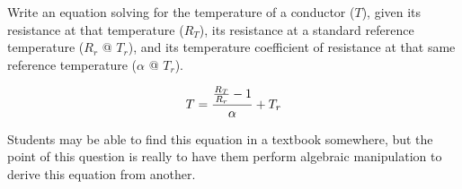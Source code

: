 

Write an equation solving for the temperature of a conductor ($T$), given its resistance at that temperature ($R_T$), its resistance at a standard reference temperature ($R_r$ @ $T_r$), and its temperature coefficient of resistance at that same reference temperature ($\alpha$ @ $T_r$).







$$T = {{{R_T \over R_r} - 1} \over \alpha} + T_r$$







Students may be able to find this equation in a textbook somewhere, but the point of this question is really to have them perform algebraic manipulation to derive this equation from another.




